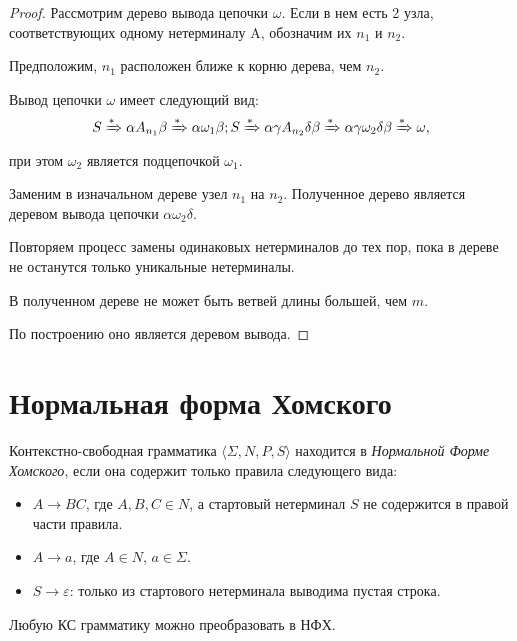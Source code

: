 \begin{proof}
    Рассмотрим дерево вывода цепочки $\omega$. Если в нем есть 2 узла, соответствующих одному нетерминалу A, обозначим их $n_1$ и $n_2$.

    Предположим, $n_1$ расположен ближе к корню дерева, чем $n_2$.

    Вывод цепочки $\omega$ имеет следующий вид:
    \[S \xRightarrow[]{*} \alpha A_{n_1} \beta \xRightarrow[]{*} \alpha \omega_1 \beta; S \xRightarrow[]{*} \alpha \gamma A_{n_2} \delta \beta \xRightarrow[]{*} \alpha \gamma \omega_2 \delta \beta \xRightarrow[]{*} \omega,\]
    при этом $\omega_2$ является подцепочкой $\omega_1$.

    Заменим в изначальном дереве узел $n_1$ на $n_2$. Полученное дерево является деревом вывода цепочки $\alpha \omega_2 \delta$.

    Повторяем процесс замены одинаковых нетерминалов до тех пор, пока в дереве не останутся только уникальные нетерминалы.

    В полученном дереве не может быть ветвей длины большей, чем $m$.

    По построению оно является деревом вывода.
\end{proof}


\section{Нормальная форма Хомского}
\label{section:CNF}

\begin{definition}
    Контекстно-свободная грамматика $\langle \Sigma, N, P, S\rangle$ находится в \emph{Нормальной Форме Хомского}, если она содержит только правила следующего вида:
    \begin{itemize}
        \item $A \to B C$, где $A, B, C \in N$, а стартовый нетерминал $S$ не содержится в правой части правила.
        \item $A \to a$, где $A \in N$, $a \in \Sigma$.
        \item $S \to \varepsilon$: только из стартового нетерминала выводима пустая строка.
    \end{itemize}
\end{definition}

\begin{theorem}
    Любую КС грамматику можно преобразовать в НФХ.
\end{theorem}

